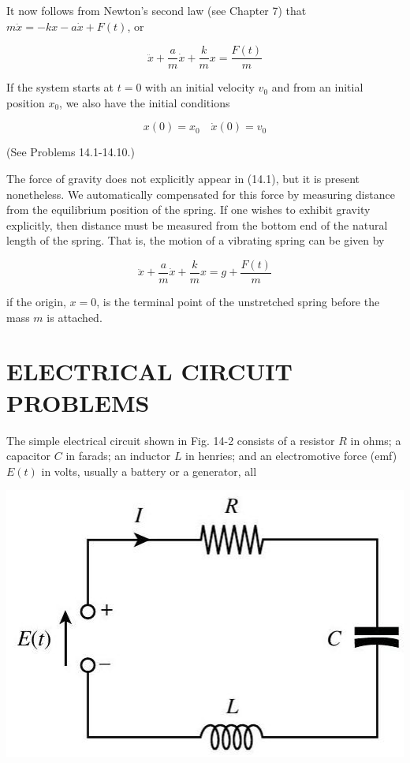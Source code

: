 \documentclass[10pt]{article}
\begin{document}
It now follows from Newton's second law (see Chapter 7) that $m \ddot{x}=-k x-a \dot{x}+F(t)$, or


\begin{equation*}
\ddot{x}+\frac{a}{m} \dot{x}+\frac{k}{m} x=\frac{F(t)}{m} \tag{14.1}
\end{equation*}


If the system starts at $t=0$ with an initial velocity $v_{0}$ and from an initial position $x_{0}$, we also have the initial conditions


\begin{equation*}
x(0)=x_{0} \quad \dot{x}(0)=v_{0} \tag{14.2}
\end{equation*}


(See Problems 14.1-14.10.)

The force of gravity does not explicitly appear in (14.1), but it is present nonetheless. We automatically compensated for this force by measuring distance from the equilibrium position of the spring. If one wishes to exhibit gravity explicitly, then distance must be measured from the bottom end of the natural length of the spring. That is, the motion of a vibrating spring can be given by

$$
\ddot{x}+\frac{a}{m} \dot{x}+\frac{k}{m} x=g+\frac{F(t)}{m}
$$

if the origin, $x=0$, is the terminal point of the unstretched spring before the mass $m$ is attached.

\section*{ELECTRICAL CIRCUIT PROBLEMS}
The simple electrical circuit shown in Fig. 14-2 consists of a resistor $R$ in ohms; a capacitor $C$ in farads; an inductor $L$ in henries; and an electromotive force (emf) $E(t)$ in volts, usually a battery or a generator, all

\begin{center}
\includegraphics[max width=\textwidth]{2024_04_03_5bb5b4275a64cb9887d1g-133}
\end{center}
\end{document}
